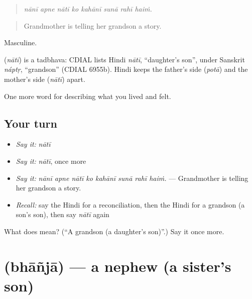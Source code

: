 \begin{quote}
\emph{nānī apne nātī ko kahānī sunā rahī haiṁ.}
\end{quote}

\begin{quote}
Grandmother is telling her grandson a story.
\end{quote}

Masculine.

\begin{cousinweb}
\textbf{} (\emph{nātī}) is a tadbhava: CDIAL lists Hindi \emph{nātī}, \textquotedblleft{}daughter's son\textquotedblright{}, under Sanskrit \emph{náptṛ}, \textquotedblleft{}grandson\textquotedblright{} (CDIAL 6955b). Hindi keeps the father's side (\emph{potā}) and the mother's side (\emph{nātī}) apart.
\end{cousinweb}

\begin{grammarlens}[title={What you've built}]
One more word for describing what you lived and felt.
\end{grammarlens}

\subsection*{Your turn}
\begin{itemize}
\raggedright
  \item \emph{Say it:} \emph{nātī}
  \item \emph{Say it:} \emph{nātī}, once more
  \item \emph{Say it:} \emph{nānī apne nātī ko kahānī sunā rahī haiṁ.} — Grandmother is telling her grandson a story.
  \item \emph{Recall:} say the Hindi for a reconciliation, then the Hindi for a grandson (a son's son), then say \emph{nātī} again
\end{itemize}

\begin{tcolorbox}[breakable,colback=teal!4,colframe=teal!35!black,title={Before you move on}]
What does  mean? (\textquotedblleft{}A grandson (a daughter's son)\textquotedblright{}.) Say it once more.
\end{tcolorbox}
\section[\texorpdfstring{\hi{भांजा} (bhāñjā)}{भांजा (bhāñjā)}]{ (bhāñjā) — a nephew (a sister's son)}

